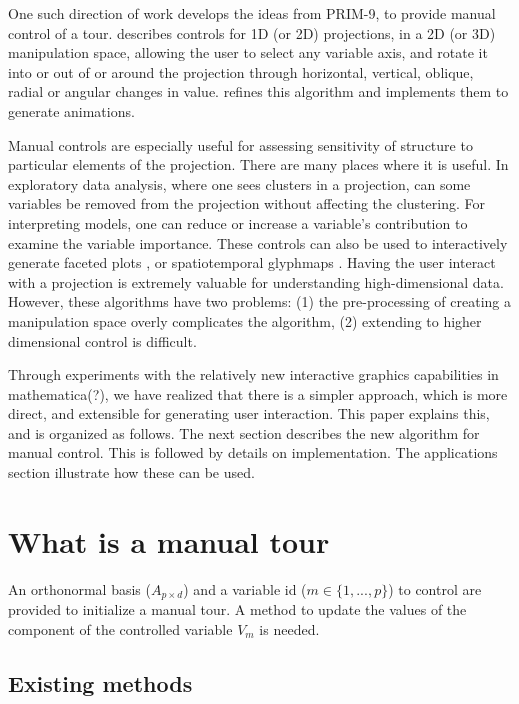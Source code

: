 \documentclass[]{interact}
\theoremstyle{plain}%
\theoremstyle{definition}
\theoremstyle{remark}
\begin{document}
One such direction of work develops the ideas from PRIM-9, to provide
manual control of a tour. \citet{cook_manual_1997} describes controls
for 1D (or 2D) projections, in a 2D (or 3D) manipulation space, allowing
the user to select any variable axis, and rotate it into or out of or
around the projection through horizontal, vertical, oblique, radial or
angular changes in value. \citet{spyrison_spinifex_2020} refines this
algorithm and implements them to generate animations.

Manual controls are especially useful for assessing sensitivity of
structure to particular elements of the projection. There are many
places where it is useful. In exploratory data analysis, where one sees
clusters in a projection, can some variables be removed from the
projection without affecting the clustering. For interpreting models,
one can reduce or increase a variable's contribution to examine the
variable importance. These controls can also be used to interactively
generate faceted plots \citep{XXX}, or spatiotemporal glyphmaps
\citep{XXX}. Having the user interact with a projection is extremely
valuable for understanding high-dimensional data. However, these
algorithms have two problems: (1) the pre-processing of creating a
manipulation space overly complicates the algorithm, (2) extending to
higher dimensional control is difficult.

Through experiments with the relatively new interactive graphics
capabilities in mathematica(?), we have realized that there is a simpler
approach, which is more direct, and extensible for generating user
interaction. This paper explains this, and is organized as follows. The
next section describes the new algorithm for manual control. This is
followed by details on implementation. The applications section
illustrate how these can be used.

\hypertarget{sec:method}{%
\section{What is a manual tour}\label{sec:method}}

An orthonormal basis (\(A_{p\times d}\)) and a variable id
(\(m \in \{1, ..., p\}\)) to control are provided to initialize a manual
tour. A method to update the values of the component of the controlled
variable \(V_m\) is needed.

\hypertarget{existing-methods}{%
\subsection{Existing methods}\label{existing-methods}}
\end{document}
